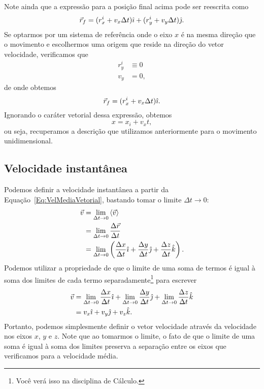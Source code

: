 Note ainda que a expressão para a posição final acima pode ser reescrita como
\begin{equation}
    \vec{r}_f = (r_x^i + v_x \Delta t)\hat{\imath} + (r_y^i + v_y\Delta t)\hat{\jmath}.
\end{equation}
%
Se optarmos por um sistema de referência onde o eixo $x$ é na mesma direção que o movimento e escolhermos uma origem que reside na direção do vetor velocidade, verificamos que
\begin{align}
    r_y^i &\equiv 0 \\
    v_y &= 0,
\end{align}
%
de onde obtemos 
\begin{equation}
    \vec{r}_f = (r_x^i + v_x \Delta t)\hat{\imath}.
\end{equation}
%
Ignorando o caráter vetorial dessa expressão, obtemos
\begin{equation}
    x = x_i + v_x t,
\end{equation}
%
ou seja, recuperamos a descrição que utilizamos anteriormente para o movimento unidimensional.

\subsection{Velocidade instantânea}

Podemos definir a velocidade instantânea a partir da Equação~\ref{Eq:VelMediaVetorial}, bastando tomar o limite $\Delta t \to 0$:
\begin{align}
    \vec{v} &= \lim_{\Delta t \to 0} \left\langle{\vec{v}}\right\rangle \\
    &= \lim_{\Delta t \to 0} \frac{\Delta\vec{r}}{\Delta t} \\
    &= \lim_{\Delta t \to 0} \left(\frac{\Delta x}{\Delta t}\hat{\imath} + \frac{\Delta y}{\Delta t}\hat{\jmath} + \frac{\Delta z}{\Delta t}\hat{k}\right).
\end{align}
%
Podemos utilizar a propriedade de que o limite de uma soma de termos é igual à soma dos limites de cada termo separadamente\footnote{Você verá isso na disciplina de Cálculo.} para escrever
\begin{align}
  \vec{v} &= \lim_{\Delta t \to 0} \frac{\Delta x}{\Delta t}\hat{\imath} + \lim_{\Delta t \to 0} \frac{\Delta y}{\Delta t}\hat{\jmath} + \lim_{\Delta t \to 0} \frac{\Delta z}{\Delta t}\hat{k} \\
  &= v_x \hat{\imath} + v_y \hat{\jmath} + v_z \hat{k}.
\end{align}
%
Portanto, podemos simplesmente definir o vetor velocidade através da velocidade nos eixos $x$, $y$ e $z$. Note que ao tomarmos o limite, o fato de que o limite de uma soma é igual à soma dos limites preserva a separação entre os eixos que verificamos para a velocidade média.

